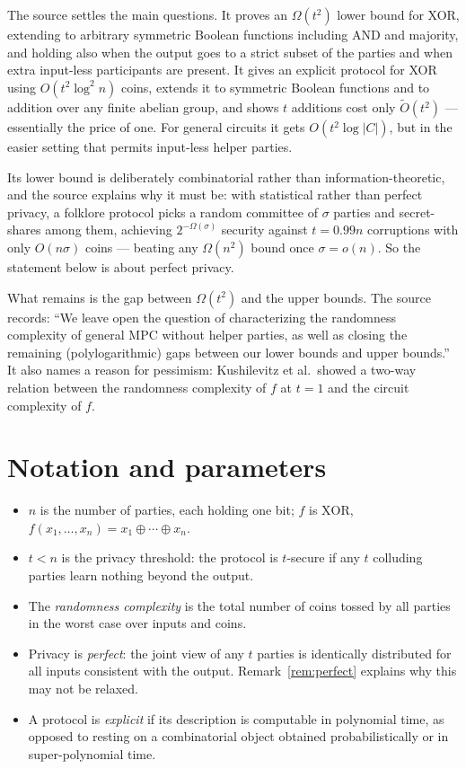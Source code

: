 \documentclass{aicr-conjecture}
\newcommand{\Om}{\Omega}
\newcommand{\Ot}{\widetilde{O}}
\begin{document}
The source settles the main questions. It proves an $\Om(t^{2})$ lower
bound for XOR, extending to arbitrary symmetric Boolean functions
including AND and majority, and holding also when the output goes to a
strict subset of the parties and when extra input-less participants are
present. It gives an explicit protocol for XOR using
$O(t^{2}\log^{2} n)$ coins, extends it to symmetric Boolean functions and
to addition over any finite abelian group, and shows $t$ additions cost
only $\Ot(t^{2})$ --- essentially the price of one. For general circuits it
gets $O(t^{2}\log|C|)$, but in the easier setting that permits
input-less helper parties.

Its lower bound is deliberately combinatorial rather than
information-theoretic, and the source explains why it must be: with
statistical rather than perfect privacy, a folklore protocol picks a
random committee of $\sigma$ parties and secret-shares among them,
achieving $2^{-\Om(\sigma)}$ security against $t = 0.99n$ corruptions with
only $O(n\sigma)$ coins --- beating any $\Om(n^{2})$ bound once $\sigma =
o(n)$. So the statement below is about perfect privacy.

What remains is the gap between $\Om(t^{2})$ and the upper bounds. The
source records: ``We leave open the question of characterizing the
randomness complexity of general MPC without helper parties, as well as
closing the remaining (polylogarithmic) gaps between our lower bounds and
upper bounds.'' It also names a reason for pessimism: Kushilevitz et al.\
showed a two-way relation between the randomness complexity of $f$ at
$t = 1$ and the circuit complexity of $f$.

\section{Notation and parameters}\label{sec:notation}

\begin{itemize}[nosep]
  \item $n$ is the number of parties, each holding one bit; $f$ is
    $\mathrm{XOR}$, $f(x_{1},\dots,x_{n}) = x_{1}\oplus\cdots\oplus
    x_{n}$.
  \item $t < n$ is the privacy threshold: the protocol is $t$-secure if
    any $t$ colluding parties learn nothing beyond the output.
  \item The \emph{randomness complexity} is the total number of coins
    tossed by all parties in the worst case over inputs and coins.
  \item Privacy is \emph{perfect}: the joint view of any $t$ parties is
    identically distributed for all inputs consistent with the output.
    Remark~\ref{rem:perfect} explains why this may not be relaxed.
  \item A protocol is \emph{explicit} if its description is computable in
    polynomial time, as opposed to resting on a combinatorial object
    obtained probabilistically or in super-polynomial time.
\end{itemize}
\end{document}
